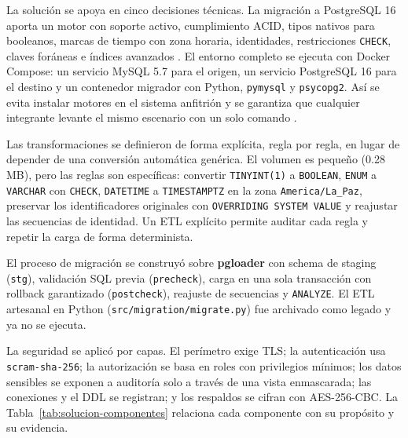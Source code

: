 La solución se apoya en cinco decisiones técnicas. La migración a
PostgreSQL 16 aporta un motor con soporte activo, cumplimiento ACID, tipos
nativos para booleanos, marcas de tiempo con zona horaria, identidades,
restricciones \texttt{CHECK}, claves foráneas e índices avanzados
\citep{postgresql2024}. El entorno completo se ejecuta con Docker Compose: un
servicio MySQL 5.7 para el origen, un servicio PostgreSQL 16 para el destino y
un contenedor migrador con Python, \texttt{pymysql} y \texttt{psycopg2}. Así se
evita instalar motores en el sistema anfitrión y se garantiza que cualquier
integrante levante el mismo escenario con un solo comando
\citep{docker2024,compose2024}.

Las transformaciones se definieron de forma explícita, regla por regla, en
lugar de depender de una conversión automática genérica. El volumen es pequeño
(0.28 MB), pero las reglas son específicas: convertir \texttt{TINYINT(1)} a
\texttt{BOOLEAN}, \texttt{ENUM} a \texttt{VARCHAR} con \texttt{CHECK},
\texttt{DATETIME} a \texttt{TIMESTAMPTZ} en la zona \texttt{America/La\_Paz},
preservar los identificadores originales con \texttt{OVERRIDING SYSTEM VALUE}
y reajustar las secuencias de identidad. Un ETL explícito permite auditar cada
regla y repetir la carga de forma determinista.

El proceso de migración se construyó sobre \textbf{pgloader}
con schema de staging (\texttt{stg}), validación SQL previa (\texttt{precheck}),
carga en una sola transacción con rollback garantizado (\texttt{postcheck}),
reajuste de secuencias y \texttt{ANALYZE}. El ETL artesanal en Python
(\texttt{src/migration/migrate.py}) fue archivado como legado y ya no se
ejecuta.

La seguridad se aplicó por capas. El perímetro exige TLS;
la autenticación usa \texttt{scram-sha-256}; la autorización se basa en roles
con privilegios mínimos; los datos sensibles se exponen a auditoría solo a
través de una vista enmascarada; las conexiones y el DDL se registran; y los
respaldos se cifran con AES-256-CBC. La Tabla~\ref{tab:solucion-componentes}
relaciona cada componente con su propósito y su evidencia.


